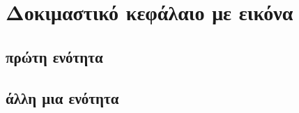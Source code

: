 \section{\texorpdfstring{Δοκιμαστικό κεφάλαιο με εικόνα }{Δοκιμαστικό κεφάλαιο με svg}}
\subsection{πρώτη ενότητα}
\en{\lipsum[1-2]}
\subsection{άλλη μια ενότητα}
\en{\lipsum[3-4]}